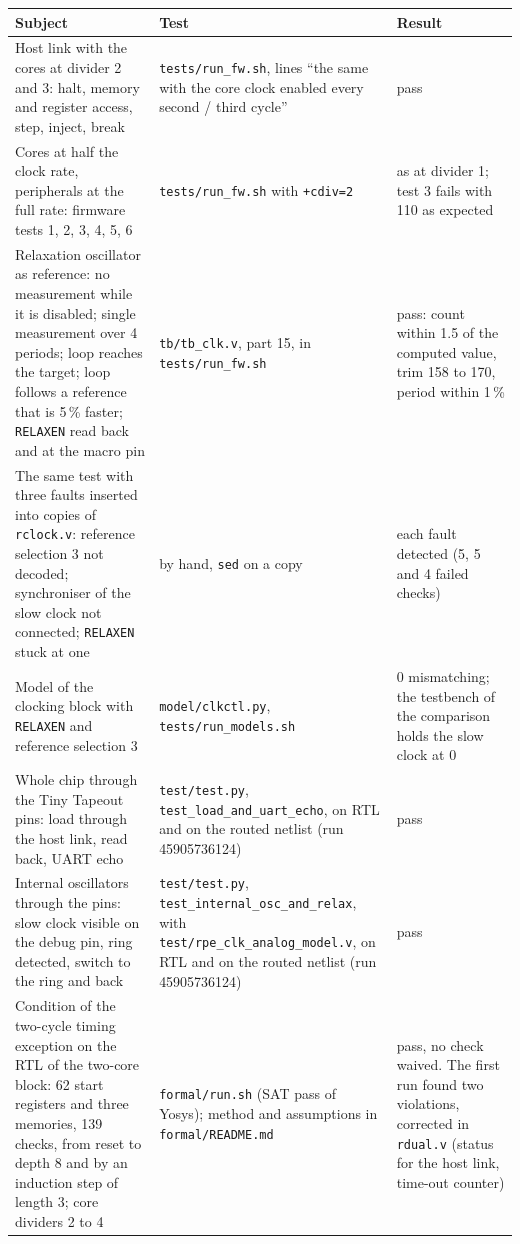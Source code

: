 \documentclass[10pt,a4paper]{article}
\newcommand{\reg}[1]{\texttt{#1}}
\begin{document}
\begin{table}[H]
\centering\small
\begin{tabularx}{\linewidth}{@{}LLL@{}}
\toprule
Subject & Test & Result \\
\midrule
Host link with the cores at divider 2 and 3: halt, memory and register access, step, inject, break & \texttt{tests/run\_fw.sh}, lines ``the same with the core clock enabled every second / third cycle'' & pass \\
Cores at half the clock rate, peripherals at the full rate: firmware tests 1, 2, 3, 4, 5, 6 & \texttt{tests/run\_fw.sh} with \texttt{+cdiv=2} & as at divider 1; test 3 fails with 110 as expected \\
Relaxation oscillator as reference: no measurement while it is disabled; single measurement over 4 periods; loop reaches the target; loop follows a reference that is 5\,\% faster; \reg{RELAXEN} read back and at the macro pin & \texttt{tb/tb\_clk.v}, part 15, in \texttt{tests/run\_fw.sh} & pass: count within 1.5 of the computed value, trim 158 to 170, period within 1\,\% \\
The same test with three faults inserted into copies of \texttt{rclock.v}: reference selection 3 not decoded; synchroniser of the slow clock not connected; \reg{RELAXEN} stuck at one & by hand, \texttt{sed} on a copy & each fault detected (5, 5 and 4 failed checks) \\
Model of the clocking block with \reg{RELAXEN} and reference selection 3 & \texttt{model/clkctl.py}, \texttt{tests/run\_models.sh} & 0 mismatching; the testbench of the comparison holds the slow clock at 0 \\
Whole chip through the Tiny Tapeout pins: load through the host link, read back, UART echo & \texttt{test/test.py}, \texttt{test\_load\_and\_uart\_echo}, on RTL and on the routed netlist (run 45905736124) & pass \\
Internal oscillators through the pins: slow clock visible on the debug pin, ring detected, switch to the ring and back & \texttt{test/test.py}, \texttt{test\_internal\_osc\_and\_relax}, with \texttt{test/rpe\_clk\_analog\_model.v}, on RTL and on the routed netlist (run 45905736124) & pass \\
Condition of the two-cycle timing exception on the RTL of the two-core block: 62 start registers and three memories, 139 checks, from reset to depth 8 and by an induction step of length 3; core dividers 2 to 4 & \texttt{formal/run.sh} (SAT pass of Yosys); method and assumptions in \texttt{formal/README.md} & pass, no check waived. The first run found two violations, corrected in \texttt{rdual.v} (status for the host link, time-out counter) \\

\end{tabularx}
\end{table}
\end{document}
